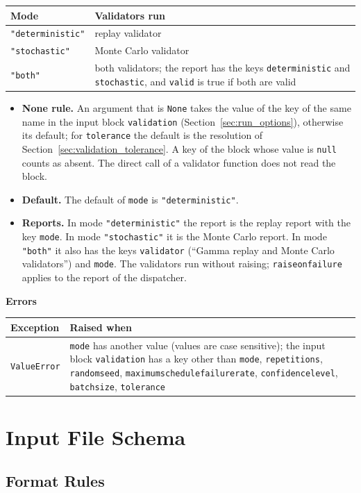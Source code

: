 \documentclass[11pt,a4paper]{article}
\makeatletter
\theoremstyle{plain}
\theoremstyle{definition}
\newcommand{\blockhead}[1]{\par\noindent\textbf{#1}\par\nobreak}
\renewcommand{\_}{\textunderscore\allowbreak{}}
\providecommand{\rejrow}[2]{{\raggedright #1\par} & {\raggedright #2\par} \\}
\providecommand{\tabstart}[2]{\begingroup\small\begin{longtable}{@{}#1@{}}\toprule #2 \\ \midrule \endhead}
\providecommand{\tabend}{\bottomrule\end{longtable}\endgroup}
\makeatother
\begin{document}
\tabstart{p{3.4cm}p{11.6cm}}{Mode & Validators run}
\rejrow{\texttt{"deterministic"}}{replay validator}
\rejrow{\texttt{"stochastic"}}{Monte Carlo validator}
\rejrow{\texttt{"both"}}{both validators; the report has the keys \texttt{deterministic} and \texttt{stochastic}, and \texttt{valid} is true if both are valid}
\tabend

\begin{itemize}[nosep]
  \item \textbf{None rule.} An argument that is \texttt{None} takes the value of the key of the same name in the input block \texttt{validation} (Section~\ref{sec:run_options}), otherwise its default; for \texttt{tolerance} the default is the resolution of Section~\ref{sec:validation_tolerance}. A key of the block whose value is \texttt{null} counts as absent. The direct call of a validator function does not read the block.
  \item \textbf{Default.} The default of \texttt{mode} is \texttt{"deterministic"}.
  \item \textbf{Reports.} In mode \texttt{"deterministic"} the report is the replay report with the key \texttt{mode}. In mode \texttt{"stochastic"} it is the Monte Carlo report. In mode \texttt{"both"} it also has the keys \texttt{validator} (``Gamma replay and Monte Carlo validators'') and \texttt{mode}. The validators run without raising; \texttt{raise\_on\_failure} applies to the report of the dispatcher.
\end{itemize}

\blockhead{Errors}
\tabstart{p{3.4cm}p{11.6cm}}{Exception & Raised when}
\rejrow{\texttt{ValueError}}{\texttt{mode} has another value (values are case sensitive); the input block \texttt{validation} has a key other than \texttt{mode}, \texttt{repetitions}, \texttt{random\_seed}, \texttt{maximum\_schedule\_failure\_rate}, \texttt{confidence\_level}, \texttt{batch\_size}, \texttt{tolerance}}
\tabend

\section{Input File Schema}\label{sec:schema}

\subsection{Format Rules}
\end{document}
